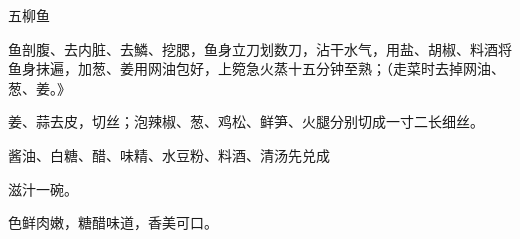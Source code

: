 \begin{recipe}{五柳鱼}

\ingredients


\cooking

\step 鱼剖腹、去内脏、去鱗、挖腮，鱼身立刀划数刀，沾干水气，用盐、胡椒、料酒将鱼身抹遍，加葱、姜用网油包好，上箢急火蒸十五分钟至熟；（走菜时去掉网油、葱、姜。》

\step 姜、蒜去皮，切丝；泡辣椒、葱、鸡松、鲜笋、火腿分别切成一寸二长细丝。

\step 酱油、白糖、醋、味精、水豆粉、料酒、清汤先兑成

滋汁一碗。

\notes

色鲜肉嫩，糖醋味道，香美可口。

\end{recipe}

